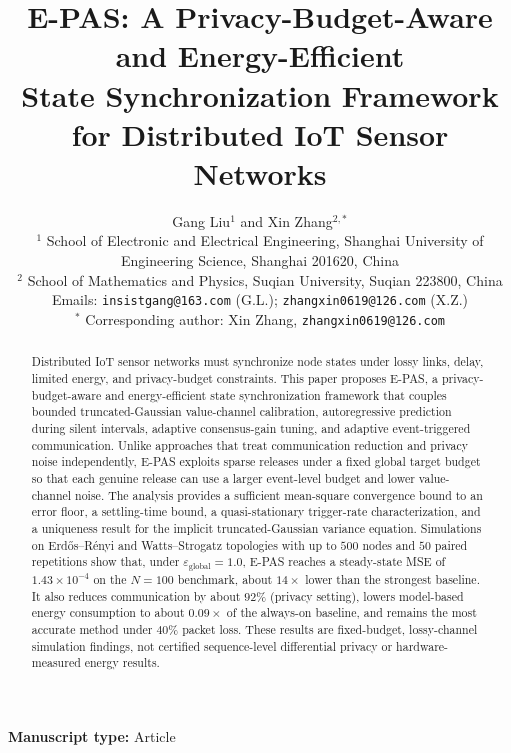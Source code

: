 \documentclass[10pt]{article}
\newcommand{\EPAS}{E-PAS}
\newcommand{\egl}{\varepsilon_{\text{global}}}
\begin{document}
\title{E-PAS: A Privacy-Budget-Aware and Energy-Efficient\\ State Synchronization Framework for Distributed IoT Sensor Networks}

\author{Gang Liu$^{1}$ and Xin Zhang$^{2,*}$\\
\small $^{1}$ School of Electronic and Electrical Engineering, Shanghai University of Engineering Science, Shanghai 201620, China\\
\small $^{2}$ School of Mathematics and Physics, Suqian University, Suqian 223800, China\\
\small Emails: \texttt{insistgang@163.com} (G.L.); \texttt{zhangxin0619@126.com} (X.Z.)\\
\small $^{*}$ Corresponding author: Xin Zhang, \texttt{zhangxin0619@126.com}}
\date{}
\maketitle

\noindent\textbf{Manuscript type:} Article


\begin{abstract}
Distributed IoT sensor networks must synchronize node states under lossy links, delay, limited energy, and privacy-budget constraints. This paper proposes \EPAS{}, a privacy-budget-aware and energy-efficient state synchronization framework that couples bounded truncated-Gaussian value-channel calibration, autoregressive prediction during silent intervals, adaptive consensus-gain tuning, and adaptive event-triggered communication. Unlike approaches that treat communication reduction and privacy noise independently, \EPAS{} exploits sparse releases under a fixed global target budget so that each genuine release can use a larger event-level budget and lower value-channel noise. The analysis provides a sufficient mean-square convergence bound to an error floor, a settling-time bound, a quasi-stationary trigger-rate characterization, and a uniqueness result for the implicit truncated-Gaussian variance equation. Simulations on Erd\H{o}s--R\'enyi and Watts--Strogatz topologies with up to $500$ nodes and $50$ paired repetitions show that, under $\egl=1.0$, \EPAS{} reaches a steady-state MSE of $1.43\times10^{-4}$ on the $N=100$ benchmark, about $14\times$ lower than the strongest baseline. It also reduces communication by about $92\%$ (privacy setting), lowers model-based energy consumption to about $0.09\times$ of the always-on baseline, and remains the most accurate method under $40\%$ packet loss. These results are fixed-budget, lossy-channel simulation findings, not certified sequence-level differential privacy or hardware-measured energy results.
\end{abstract}
\end{document}
